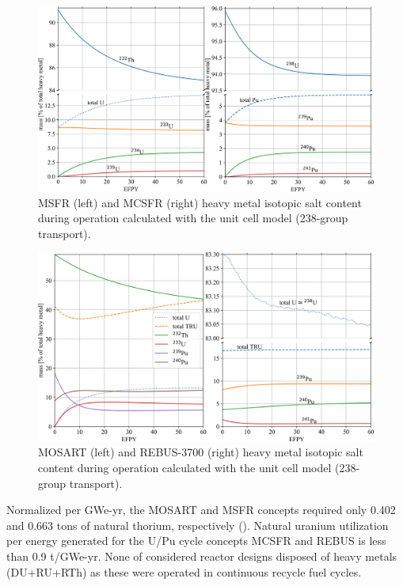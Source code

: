 \documentclass[letterpaper]{mandc2019}
\begin{document}
\begin{figure}[!htb]
  \centering
  \includegraphics[width=\textwidth]{./Figures/msfr_mcsfr_balance.png}
  \caption{\gls{MSFR} (left) and \gls{MCSFR} (right) heavy metal isotopic salt content during operation calculated with the unit cell model (238-group transport).}
  \label{fig:msfr-u-balance}
    \vspace{-0.5in}
\end{figure}
\begin{figure}[!htb]
  \centering
  \includegraphics[width=\textwidth]{./Figures/mosart_rebus_balance.png}
  \caption{\gls{MOSART} (left) and REBUS-3700 (right) heavy metal isotopic salt content during operation calculated with the unit cell model (238-group transport).}
  \label{fig:mosart-balance}
    \vspace{-0.5in}
\end{figure}

Normalized per GWe-yr, the \gls{MOSART} and \gls{MSFR} concepts required only 0.402 and 0.663 tons of natural thorium, respectively (). Natural uranium utilization per energy generated for the U/Pu cycle concepts \gls{MCSFR} and REBUS is less than 0.9 t/GWe-yr. None of considered reactor designs disposed of heavy metals (\gls{DU}+\gls{RU}+\gls{RTh}) as these were operated in continuous recycle fuel cycles.
\end{document}
